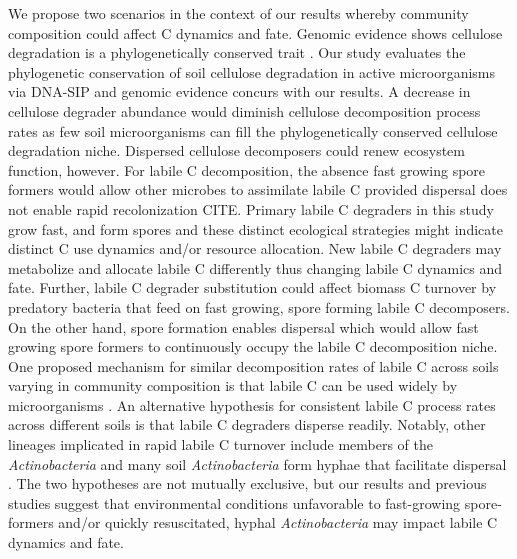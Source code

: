 We propose two scenarios in the context of our results whereby community
composition could affect C dynamics and fate. Genomic evidence shows cellulose
degradation is a phylogenetically conserved trait \citep{Berlemont2013}. Our
study evaluates the phylogenetic conservation of soil cellulose degradation in
active microorganisms via DNA-SIP and genomic evidence concurs with our
results. A decrease in cellulose degrader abundance would diminish cellulose
decomposition process rates as few soil microorganisms can fill the
phylogenetically conserved cellulose degradation niche. Dispersed cellulose
decomposers could renew ecosystem function, however. For labile
C decomposition, the absence fast growing spore formers would allow other
microbes to assimilate labile C provided dispersal does not enable rapid
recolonization CITE. Primary labile C degraders in this study grow fast, and
form spores and these distinct ecological strategies might indicate distinct
C use dynamics and/or resource allocation. New labile C degraders may
metabolize and allocate labile C differently thus changing labile C dynamics
and fate. Further, labile C degrader substitution could affect biomass
C turnover by predatory bacteria that feed on fast growing, spore forming
labile C decomposers. On the other hand, spore formation enables dispersal
\citep{Nicholson2000} which would allow fast growing spore formers to
continuously occupy the labile C decomposition niche. One proposed mechanism
for similar decomposition rates of labile C across soils varying in community
composition is that labile C can be used widely by microorganisms
\citep{McGuire2010}. An alternative hypothesis for consistent labile C process
rates across different soils is that labile C degraders disperse readily.
Notably, other lineages implicated in rapid labile C turnover include members
of the \textit{Actinobacteria} \citep{Placella2012} and many soil
\textit{Actinobacteria} form hyphae that facilitate dispersal
\citep{KILLHAM2007}. The two hypotheses are not mutually exclusive, but our
results and previous studies suggest that environmental conditions unfavorable
to fast-growing spore-formers and/or quickly resuscitated, hyphal
\textit{Actinobacteria} may impact labile C dynamics and fate.

